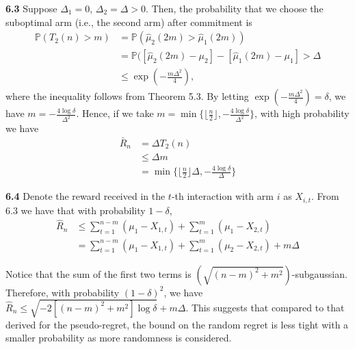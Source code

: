 \noindent\textbf{6.3}
Suppose $\Delta_1 = 0$, $\Delta_2 = \Delta > 0$.
Then, the probability that we choose the suboptimal arm (i.e., the second arm) after commitment is
\begin{equation*}
    \begin{aligned}
        \mathbb{P}(T_{2}(n)>m)
        &= \mathbb{P}(\hat{\mu}_{2}(2 m) > \hat{\mu}_{1}(2 m))\\
        &= \mathbb{P}(\left[\hat{\mu}_{2}(2 m) - \mu_2\right] - \left[\hat{\mu}_{1}(2 m) - \mu_1\right]> \Delta\\
        &\leq \exp(-\frac{m\Delta^2}{4}),
    \end{aligned}
\end{equation*}
where the inequality follows from Theorem 5.3.
By letting $\exp(-\frac{m\Delta^2}{4}) = \delta$, we have $m = -\frac{4\log\delta}{\Delta^2}$.
Hence, if we take $m = \min\{\lfloor \frac{n}{2}\rfloor, -\frac{4\log\delta}{\Delta^2}\}$, with high probability we have
\begin{equation*}
    \begin{aligned}
        \bar{R}_{n}
        &= \Delta T_2(n)\\
        &\leq \Delta m\\
        &= \min\{\lfloor \frac{n}{2}\rfloor \Delta, -\frac{4\log\delta}{\Delta}\}
    \end{aligned}
\end{equation*}

\noindent\textbf{6.4}
Denote the reward received in the $t$-th interaction with arm $i$ as $X_{i, t}$.
From 6.3 we have that with probability $1 - \delta$,
\begin{equation*}
    \begin{aligned}
        \hat{R}_{n}
        &\leq \sum_{t = 1}^{n - m} (\mu_1 - X_{1, t}) + \sum_{t = 1}^{m} (\mu_1 - X_{2, t})\\
        &= \sum_{t = 1}^{n - m} (\mu_1 - X_{1, t}) + \sum_{t = 1}^{m} (\mu_2 - X_{2, t}) + m\Delta
    \end{aligned}
\end{equation*}

Notice that the sum of the first two terms is $(\sqrt{(n - m)^2 + m^2})$-subgaussian.
Therefore, with probability $(1 - \delta)^2$, we have $\hat{R}_{n} \leq \sqrt{-2[(n - m)^2 + m^2] \log \delta} + m \Delta$.
This suggests that compared to that derived for the pseudo-regret, the bound on the random regret is less tight with a smaller probability as more randomness is considered.


